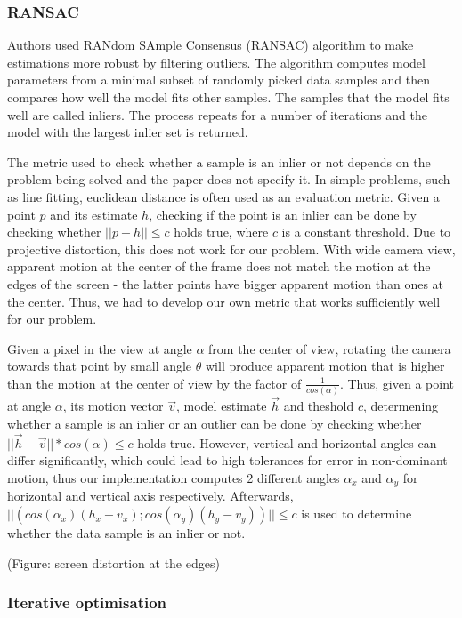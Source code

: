 \documentclass[11pt,english]{report}
\begin{document}
\subsubsection{RANSAC}

Authors used RANdom SAmple Consensus (RANSAC)\cite{FISCHLER1987726} algorithm to make estimations more robust by filtering outliers. The algorithm computes model parameters from a minimal subset of randomly picked data samples and then compares how well the model fits other samples. The samples that the model fits well are called inliers. The process repeats for a number of iterations and the model with the largest inlier set is returned.

The metric used to check whether a sample is an inlier or not depends on the problem being solved and the paper does not specify it. In simple problems, such as line fitting, euclidean distance is often used as an evaluation metric. Given a point $p$ and its estimate $h$, checking if the point is an inlier can be done by checking whether $||p - h|| \leq c$ holds true, where $c$ is a constant threshold. Due to projective distortion, this does not work for our problem. With wide camera view, apparent motion at the center of the frame does not match the motion at the edges of the screen - the latter points have bigger apparent motion than ones at the center. Thus, we had to develop our own metric that works sufficiently well for our problem.

Given a pixel in the view at angle $\alpha$ from the center of view, rotating the camera towards that point by small angle $\theta$ will produce apparent motion that is higher than the motion at the center of view by the factor of $\frac{1}{cos(\alpha)}$. Thus, given a point at angle $\alpha$, its motion vector $\overrightarrow{v}$, model estimate $\overrightarrow{h}$ and theshold $c$, determening whether a sample is an inlier or an outlier can be done by checking whether $||\overrightarrow{h} - \overrightarrow{v}|| * cos(\alpha) \leq c$ holds true. However, vertical and horizontal angles can differ significantly, which could lead to high tolerances for error in non-dominant motion, thus our implementation computes 2 different angles $\alpha_x$ and $\alpha_y$ for horizontal and vertical axis respectively. Afterwards, $||(cos(\alpha_x) (h_x - v_x); cos(\alpha_y) (h_y - v_y))|| \leq c$ is used to determine whether the data sample is an inlier or not.

(Figure: screen distortion at the edges)

\subsubsection{Iterative optimisation}
\end{document}
